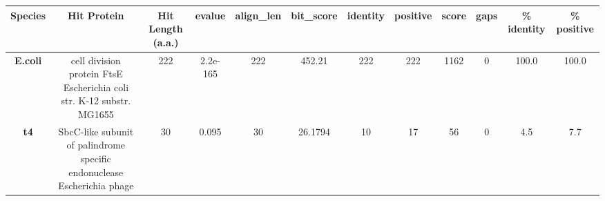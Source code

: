 \begin{tabular}{|c|c|c|c|c|c|c|c|c|c|c|c|} \hline
\textbf{Species} & \textbf{Hit Protein} & \textbf{Hit Length (a.a.)} & \textbf{evalue} & \textbf{align\_len} & \textbf{bit\_score} & \textbf{identity} & \textbf{positive} & \textbf{score} & \textbf{gaps} & \textbf{\% identity} & \textbf{\% positive} \\ \hline
\textbf{E.coli} & cell division protein FtsE Escherichia coli str. K-12 substr. MG1655 & 222 & 2.2e-165 & 222 & 452.21 & 222 & 222 & 1162 & 0 & 100.0 & 100.0\\
\textbf{t4} & SbcC-like subunit of palindrome specific endonuclease Escherichia phage  & 30 & 0.095 & 30 & 26.1794 & 10 & 17 & 56 & 0 & 4.5 & 7.7\\
\hline \end{tabular}
